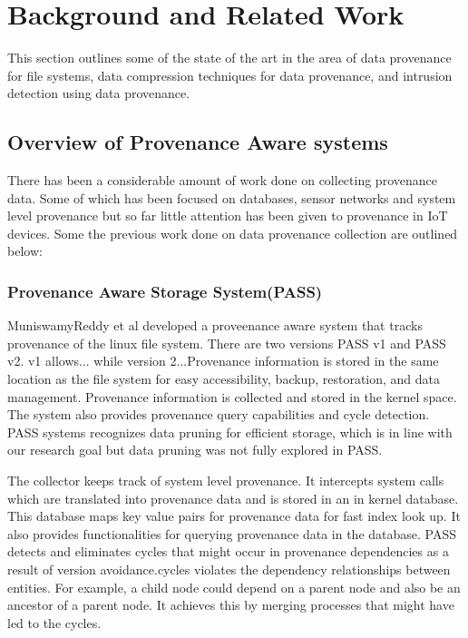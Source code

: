 
\chapter{Background and Related Work}\label{background}

This section outlines some of the state of the art in the area of data provenance for file systems, data compression techniques for data provenance, and intrusion detection using data provenance.

\section{Overview of Provenance Aware systems}

There has been a considerable amount of work done on collecting provenance data. Some of which has been focused on databases, sensor networks and system level provenance but so far little attention has been given to provenance in IoT devices. Some the previous work done on data provenance collection are outlined below:

\subsection{Provenance Aware Storage System(PASS)}
MuniswamyReddy
et al developed a proveenance aware system that tracks provenance of the linux file system. There are two versions PASS v1 and PASS v2. v1 allows... while version 2...Provenance information
is stored in the same location as the file system for easy accessibility, backup,
restoration, and data management. Provenance information is collected and stored in
the kernel space. The system also provides provenance query capabilities and cycle
detection. PASS systems recognizes data pruning for efficient storage, which is in line
with our research goal but data pruning was not fully explored in PASS.

The collector keeps track of system level provenance. It intercepts system calls which are translated into provenance data and is stored in an in kernel database. This database maps key value pairs for provenance data for fast index look up. It also provides functionalities for querying provenance data in the database. PASS detects and eliminates cycles that might occur in provenance dependencies as a result of version avoidance.cycles violates the dependency relationships between entities. For example, a child node could depend on a parent node and also be an ancestor of a parent node. It achieves this by merging processes that might have led to the cycles.

